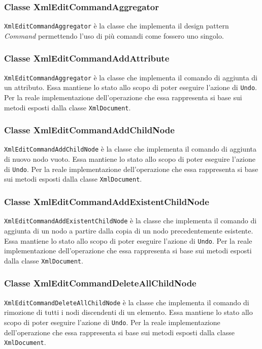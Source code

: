 	\subsubsection{Classe XmlEditCommandAggregator}
		\texttt{XmlEditCommandAggregator} è la classe che implementa il design pattern \textit{Command} permettendo l'uso di più comandi come fossero uno singolo.
		
	\subsubsection{Classe XmlEditCommandAddAttribute}
		\texttt{XmlEditCommandAggregator} è la classe che implementa il comando di aggiunta di un attributo. Essa mantiene lo stato allo scopo di poter eseguire l'azione di \texttt{Undo}. Per la reale implementazione dell'operazione che essa rappresenta si base sui metodi esposti dalla classe \texttt{XmlDocument}.
		
	\subsubsection{Classe XmlEditCommandAddChildNode}
		\texttt{XmlEditCommandAddChildNode} è la classe che implementa il comando di aggiunta di nuovo nodo vuoto. Essa mantiene lo stato allo scopo di poter eseguire l'azione di \texttt{Undo}. Per la reale implementazione dell'operazione che essa rappresenta si base sui metodi esposti dalla classe \texttt{XmlDocument}.
		
	\subsubsection{Classe XmlEditCommandAddExistentChildNode}
		\texttt{XmlEditCommandAddExistentChildNode} è la classe che implementa il comando di aggiunta di un nodo a partire dalla copia di un nodo precedentemente esistente. Essa mantiene lo stato allo scopo di poter eseguire l'azione di \texttt{Undo}. Per la reale implementazione dell'operazione che essa rappresenta si base sui metodi esposti dalla classe \texttt{XmlDocument}.

	\subsubsection{Classe XmlEditCommandDeleteAllChildNode}
		\texttt{XmlEditCommandDeleteAllChildNode} è la classe che implementa il comando di rimozione di tutti i nodi discendenti di un elemento. Essa mantiene lo stato allo scopo di poter eseguire l'azione di \texttt{Undo}. Per la reale implementazione dell'operazione che essa rappresenta si base sui metodi esposti dalla classe \texttt{XmlDocument}.
			
